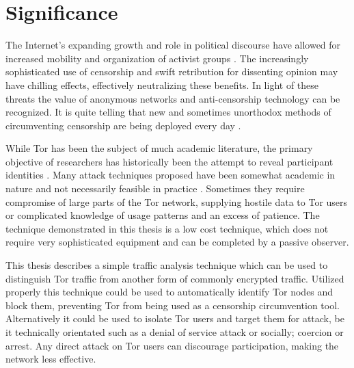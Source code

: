 \documentclass{ecuthesis}
\begin{document}
\section{Significance}

The Internet's expanding growth \parencite{Miniwatts-Marketing-Group:2010uq} and
role in political discourse \parencite{Bonchek:1997p3455} have allowed for
increased mobility and organization of activist groups
\parencite{Alexander:2011kx,Anderson:2011vn}. The increasingly sophisticated use
of censorship \parencite{Crandall:2007p6165,Karlin:2009p6166} and swift
retribution for dissenting opinion
\parencite{website:china-yahoo-torture,website:vietnam-bloggers-arrested,website:egypt-arrests,website:blogger-arrests}
may have chilling effects, effectively neutralizing these benefits. In light of
these threats the value of anonymous networks and anti-censorship technology can
be recognized. It is quite telling that new and sometimes unorthodox methods of
circumventing censorship are being deployed every day
\parencite{The-Economist:2011fk,Brading:2011ys}.

While Tor has been the subject of much academic literature, the primary
objective of researchers has historically been the attempt to reveal participant
identities \parencite[3]{Murdoch:2005p325}.  Many attack techniques proposed
have been somewhat academic in nature and not necessarily feasible in practice
\parencite{Raccoon:2008fk}. Sometimes they require compromise of large parts of
the Tor network, supplying hostile data to Tor users or complicated knowledge of
usage patterns and an excess of patience. The technique demonstrated in this
thesis is a low cost technique, which does not require very sophisticated
equipment and can be completed by a passive observer.

This thesis describes a simple traffic analysis technique which can be used to
distinguish Tor traffic from another form of commonly encrypted traffic.
Utilized properly this technique could be used to automatically identify Tor
nodes and block them, preventing Tor from being used as a censorship
circumvention tool.  Alternatively it could be used to isolate Tor users and
target them for attack, be it technically orientated such as a denial of service
attack or socially; coercion or arrest. Any direct attack on Tor users can
discourage participation, making the network less effective.

\end{document}
